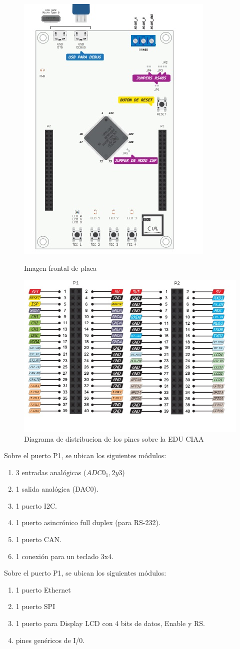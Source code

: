 \documentclass[conference]{IEEEtran}
\begin{document}
\begin{figure}[!t]
\centering
\includegraphics[width=8 cm]{figuras/FIGURA_1.jpg}\\
\caption{Imagen frontal de placa}
\label{Fig2}
\end{figure}

\begin{figure}[!t]
\centering
\includegraphics[width=8 cm]{figuras/FIGURA_2.jpg}
\caption{Diagrama de distribucion de los pines sobre la EDU CIAA }
\label{Fig1}
\end{figure}

Sobre el puerto P1, se ubican los siguientes módulos:
\begin{enumerate}
\item 3 entradas analógicas ($ADC0_ 1,2 y 3$)
\item 1 salida analógica (DAC0).
\item 1 puerto I2C.
\item 1 puerto asincrónico full duplex (para RS-232).
\item 1 puerto CAN.
\item 1 conexión para un teclado 3x4.
\end{enumerate}
Sobre el puerto P1, se ubican los siguientes módulos:
\begin{enumerate}
\item 1 puerto Ethernet
\item 1 puerto SPI
\item 1 puerto para Display LCD con 4 bits de datos, Enable y RS.
\item pines genéricos de I/0.
\end{enumerate}
\end{document}
